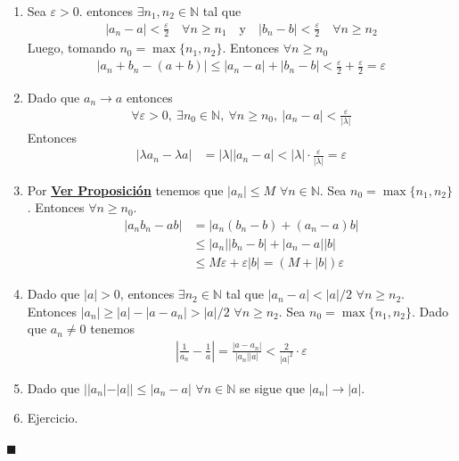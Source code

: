 \documentclass[12pt]{book}
\renewenvironment{proof}[1][\textit{Demostración}]{%
  \par\noindent{\bfseries #1.}\enspace}{\hfill$\blacksquare$\par}
\begin{document}
\begin{proof}
    \begin{enumerate}
        \item   Sea $\varepsilon >0$. entonces $\exists n_1, n_2 \in \mathbb{N}$ tal que 
    \begin{align*}
        |a_n-a| < \frac{\varepsilon}{2}\quad \forall n \geq n_1 \quad \text{y} \quad |b_n-b|< \frac{\varepsilon}{2} \quad \forall n \geq n_2
    \end{align*}
    Luego, tomando $n_0=\max\{n_1,n_2\}$. Entonces $\forall n \geq n_0$
        \begin{align*}
            |a_n+b_n-(a+b)| \leq |a_n - a | + |b_n-b| < \frac{\varepsilon}{2}+ \frac{\varepsilon}{2} = \varepsilon
        \end{align*}
        \item Dado que $a_n \to a$ entonces
        \begin{align*}
            \forall \varepsilon >0, \ \exists n_0 \in \mathbb{N}, \ \forall n \geq n_0, \ |a_n-a| < \frac{\varepsilon}{|\lambda|}
        \end{align*}
        Entonces
        \begin{align*}
            |\lambda a_n - \lambda a| &= |\lambda||a_n-a| < |\lambda | \cdot \frac{\varepsilon}{|\lambda|} = \varepsilon
        \end{align*}

        \item Por \hyperref[th:conv.acotada]{\textbf{Ver Proposición}} tenemos que $|a_n| \leq M$ $\forall n  \in \mathbb{N}$. Sea $n_0 = \max\{n_1,n_2\}$. Entonces $\forall n \geq n_0$.
        \begin{align*}
            |a_n b_n - ab|  &= | a_n(b_n-b)+(a_n-a)b| \\
            &\leq |a_n||b_n-b|+|a_n-a||b| \\
            &\leq M \varepsilon + \varepsilon |b|= (M+|b|) \varepsilon
        \end{align*}

        \item Dado que $|a| >0$, entonces $\exists n_2 \in \mathbb{N}$ tal que $|a_n-a|<|a|/2$ $\forall n \geq n_2$. Entonces $|a_n|\geq |a|-|a-a_n| > |a|/2$ $\forall n \geq n_2$. Sea $n_0 = \max\{ n_1,n_2\}$. Dado que $a_n\neq 0$ tenemos 
        \begin{align*}
            \left| \frac{1}{a_n}-\frac{1}{a}\right|=\frac{|a-a_n|}{|a_n||a|}< \frac{2}{|a|^2}\cdot \varepsilon 
        \end{align*}

        \item Dado que $||a_n|-|a|| \leq |a_n-a |$ $\forall n \in \mathbb{N}$ se sigue que $|a_n| \to |a|$.

        \item Ejercicio.
    \end{enumerate}
\end{proof}
\end{document}
